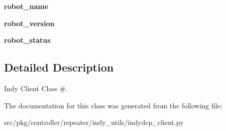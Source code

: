 \begin{DoxyCompactItemize}
{\bfseries robot\+\_\+name}
\item 
\mbox{\label{classrnb-planning_1_1src_1_1pkg_1_1controller_1_1repeater_1_1indy__utils_1_1indydcp__client_1_1_indy_d_c_p_client_aeca9f31143d72547805f16e0f62d10b7}} 
{\bfseries robot\+\_\+version}
\item 
\mbox{\label{classrnb-planning_1_1src_1_1pkg_1_1controller_1_1repeater_1_1indy__utils_1_1indydcp__client_1_1_indy_d_c_p_client_a6cf9aee64461847127322920dbd45155}} 
{\bfseries robot\+\_\+status}
\end{DoxyCompactItemize}


\subsection{Detailed Description}
Indy Client Class \#. 

The documentation for this class was generated from the following file\+:\begin{DoxyCompactItemize}
\item 
src/pkg/controller/repeater/indy\+\_\+utils/indydcp\+\_\+client.\+py\end{DoxyCompactItemize}
